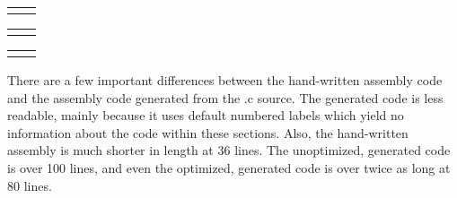 \documentclass[letterpaper,12pt,titlepage]{article}
\begin{document}


\begin{tabular}{p{7.5cm} p{7.5cm} }

&

\end{tabular}

\begin{tabular}{p{7.5cm} p{7.5cm} }

&

\end{tabular}

\begin{tabular}{p{7.5cm} p{7.5cm} }
 &
\end{tabular}

There are a few important differences between the hand-written assembly code and the assembly code generated from the .c source. The generated code is less readable, mainly because it uses default numbered labels which yield no information about the code within these sections. Also, the hand-written assembly is much shorter in length at 36 lines. The unoptimized, generated code is over 100 lines, and even the optimized, generated code is over twice as long at 80 lines.
\end{document}
